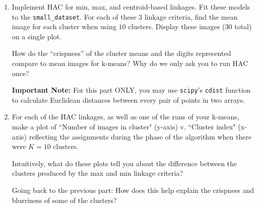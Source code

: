 \documentclass[submit]{harvardml}
\begin{document}
\begin{problem}
\begin{enumerate}
\item Implement HAC for min, max, and centroid-based linkages. Fit
  these models to the \texttt{small\_dataset}.  For each of these 3
  linkage criteria, find the mean image for each cluster when using
  $10$ clusters. Display these images (30 total) on a single plot.

  How do the ``crispness'' of the cluster means and the digits
  represented compare to mean images for k-means?  
  Why do we only ask you to run HAC once?  

  \textbf{Important Note:} For this part ONLY, you may use
  \texttt{scipy}'s \texttt{cdist} function to calculate Euclidean
  distances between every pair of points in two arrays.

\item For each of the HAC linkages, as well as one of the runs of your
  k-means, make a plot of ``Number of images in cluster" (y-axis)
  v. ``Cluster index" (x-axis) reflecting the assignments during the
  phase of the algorithm when there were $K=10$ clusters.

  Intuitively, what do these plots tell you about the difference
  between the clusters produced by the max and min linkage criteria?

  Going back to the previous part: How does this help explain the
  crispness and blurriness of some of the clusters?  

\end{enumerate}
\end{problem}
\end{document}
